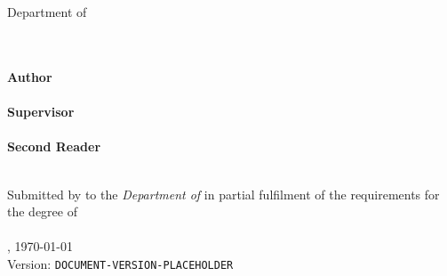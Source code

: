\begin{titlepage}
	\begin{center}
		{\Large%
		   \textsc{\university{}}%
		}
		\\\medskip
		{%
			\textbf{%
				\universityFaculty{}
			}\\
			Department of \universityDepartment{}%
		}
		\\\vfill
		{\Large%
			\textbf{\shortTitle{}}%
		}
		\\\bigskip
		{\Huge%
			\sffamily{%
				\textbf\documentTitle{}%
			}\par%
		}
		\medskip
		{\large%
			\textsl{%
				\documentSubtitle{}%
			}
			\\\vfill
			\textbf{Author}\\
			\documentAuthor{}\\
			\bigskip
			\textbf{Supervisor}\\
			\researchAdvisor{}\\
			\medskip
			\textbf{Second Reader}\\
			\secondReader{}\\
		}
	\end{center}
	\newpage
	\pagestyle{empty}\vspace*{\fill}%
	\noindent%
	Submitted by \textbf{\documentAuthor{}} to the \textsl{Department of \universityDepartment{}} in partial fulfilment of the requirements for the degree of\\
	\textbf{\academicDegree{}}\\
	\medskip{}
	\documentPlace{}, \germanDate{}\today{}\\
	Version: \texttt{DOCUMENT-VERSION-PLACEHOLDER}\\
\end{titlepage}
